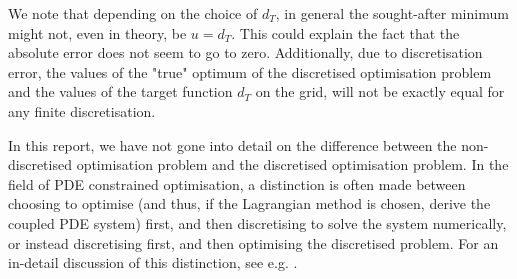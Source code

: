 We note that depending on the choice of $d_T$, in general the sought-after minimum might not, even in theory, be $u=d_T$. This could explain the fact that the absolute error does not seem to go to zero. Additionally, due to discretisation error, the values of the "true" optimum of the discretised optimisation problem and the values of the target function $d_T$ on the grid, will not be exactly equal for any finite discretisation. 

In this report, we have not gone into detail on the difference between the non-discretised optimisation problem and the discretised optimisation problem. In the field of PDE constrained optimisation, a distinction is often made between choosing to optimise (and thus, if the Lagrangian method is chosen, derive the coupled PDE system) first, and then discretising to solve the system numerically, or instead discretising first, and then optimising the discretised problem. For an in-detail discussion of this distinction, see e.g. \cite{rees_preconditioning_2010}. 
